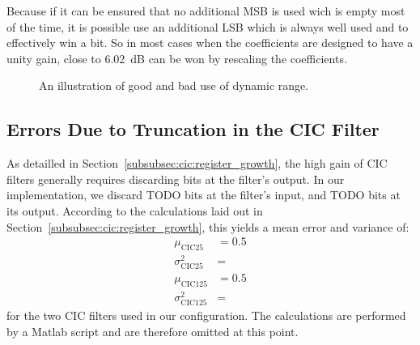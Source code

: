 Because if it can be ensured that no additional MSB is used wich is empty most
of the time,  it is possible use  an additional LSB which is  always well used
and  to effectively  win a  bit. So in  most cases  when the  coefficients are
designed to have a unity gain, close to \SI{6.02}{\dB} can be won by rescaling
the coefficients.

\begin{figure}
    \centering
    
    \caption{An illustration of good and bad use of dynamic range.}
    \label{fig:fpga:dynamicrange}
\end{figure}

%
%
\subsection{Errors Due to Truncation in the CIC Filter} %
\label{subsec:fpga:errors_in_cic_filter}

As detailled in Section~\ref{subsubsec:cic:register_growth},  the high gain of
CIC  filters generally  requires discarding  bits at  the filter's  output. In
our  implementation,  we  discard  TODO   bits  at  the  filter's  input,  and
TODO  bits  at   its  output. According  to  the  calculations   laid  out  in
Section~\ref{subsubsec:cic:register_growth},  this  yields  a mean  error  and
variance of:
\begin{align}
    \mu_\mathrm{CIC25}       &= 0.5 \label{eq:fpga:cic:mu:cic25}  \\
    \sigma^2_\mathrm{CIC25}  &= \label{eq:fpga:cic:sigmasq:cic25} \\
    \mu_\mathrm{CIC125}      &= 0.5 \label{eq:fpga:cic:mu:cic125} \\
    \sigma^2_\mathrm{CIC125} &= \label{eq:fpga:cic:sigmasq:cic125}
\end{align}
for  the two  CIC filters  used in  our configuration.   The calculations  are
performed by a Matlab script and are therefore omitted at this point.

